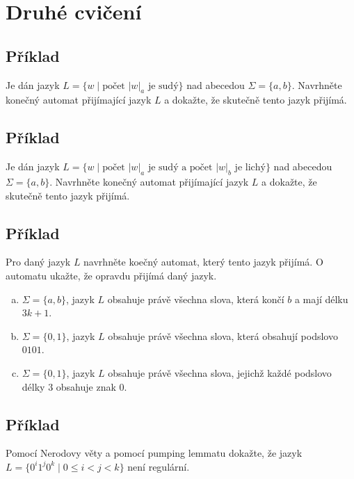 \section{Druhé cvičení}

\subsection{Příklad}

Je dán jazyk $L = \{w \mid \text{počet } |w|_a \text{ je sudý}\}$ nad abecedou $\Sigma = \{a,b\}$. Navrhněte konečný 
automat přijímající jazyk $L$ a dokažte, že skutečně tento jazyk přijímá. 

\subsection{Příklad}
Je dán jazyk $L = \{w \mid \text{počet } |w|_a \text{ je sudý a počet } |w|_b \text{ je lichý}\}$ nad abecedou 
$\Sigma = \{a,b\}$. Navrhněte konečný automat přijímající jazyk $L$ a dokažte, že skutečně tento jazyk přijímá. 

\subsection{Příklad}
Pro daný jazyk $L$ navrhněte koečný automat, který tento jazyk přijímá. O automatu ukažte, že opravdu přijímá daný jazyk.

\begin{enumerate}[a), noitemsep]
    \item $\Sigma = \{a,b\}$, jazyk $L$ obsahuje právě všechna slova, která končí $b$ a mají délku $3k+1$.
    \item $\Sigma = \{0,1\}$, jazyk $L$ obsahuje právě všechna slova, která obsahují podslovo $0101$.
    \item $\Sigma = \{0,1\}$, jazyk $L$ obsahuje právě všechna slova, jejichž každé podslovo délky $3$ obsahuje znak $0$.
\end{enumerate}

\subsection{Příklad}
Pomocí Nerodovy věty a pomocí pumping lemmatu dokažte, že jazyk $L = \{0^i 1^j 0^k \mid 0 \leq i < j <k\}$ není regulární.